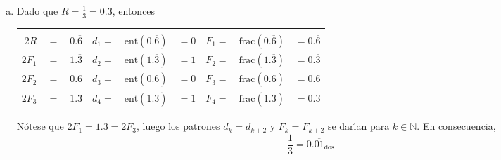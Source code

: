 \begin{solucion}
\begin{enumerate}[(a)]
  \item Dado que $R = \frac{1}{3} = 0.\overline{3}$, entonces 
  \begin{center}
   \begin{tabular}{rclrclrcl}
    & & & \hspace{1.5cm} & & \hspace{1.5cm} \\
    $2R$ & $=$ & $0.\overline{6}$ & $d_1 =$ & $\text{ent}\left(0.\overline{6}\right)$ & $=0$ & $F_1 =$ & $\text{frac}\left(0.\overline{6}\right)$ & $=0.\overline{6}$ \\
    $2F_1$ & $=$ & $1.\overline{3}$ & $d_2 =$ & $\text{ent}\left(1.\overline{3}\right)$ & $=1$ & $F_2 =$ & $\text{frac}\left(1.\overline{3}\right)$ & $=0.\overline{3}$ \\
    $2F_2$ & $=$ & $0.\overline{6}$ & $d_3 =$ & $\text{ent}\left(0.\overline{6}\right)$ & $=0$ & $F_3 =$ & $\text{frac}\left(0.\overline{6}\right)$ & $=0.\overline{6}$ \\
    $2F_3$ & $=$ & $1.\overline{3}$ & $d_4 =$ & $\text{ent}\left(1.\overline{3}\right)$ & $=1$ & $F_4 =$ & $\text{frac}\left(1.\overline{3}\right)$ & $=0.\overline{3}$ \\
   \end{tabular}
  \end{center}
  N\'otese que $2F_1 = 1.\overline{3} = 2F_3$, luego los patrones $d_k = d_{k+2}$ y $F_k = F_{k+2}$ se dar\'{\i}an para $k \in \mathbb{N}$. En consecuencia,
  \begin{equation*}
   \frac{1}{3} = 0.\overline{01}_{\text{dos}}
  \end{equation*}


\end{enumerate}
\end{solucion}
